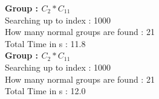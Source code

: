 \textbf{Group : $C_2*C_{11}$}\\
Searching up to index : 1000\\
How many normal groups are found : 21\\
Total Time in s : 11.8\\
\textbf{Group : $C_2*C_{11}$}\\
Searching up to index : 1000\\
How many normal groups are found : 21\\
Total Time in s : 12.0\\
